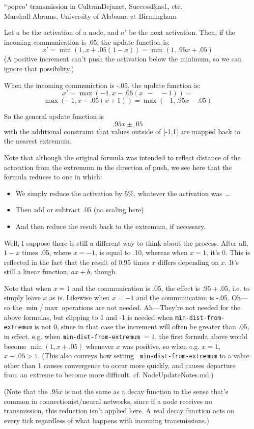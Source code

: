 \documentclass[11pt]{article}
\author{Marshall Abrams, University of Alabama at Birmingham, mabrams@uab.edu}
\makeatletter
\newcommand{\eg}{e.g.\@\xspace}
\newcommand{\cf}{cf.\@\xspace}
\makeatother
\begin{document}
\pagestyle{empty}
\myfontscale %

{\Large ``popco" transmission in CultranDejanet, SuccessBias1, etc.}\\
{\large Marshall Abrams, University of Alabama at Birmingham}


Let $a$ be the activation of a node, and $a'$ be the next activation.
Then, if the incoming communication is .05, the update function
is:
\[
x' = \min(1,x + .05(1 - x)) = \min(1,.95x + .05)
\]
(A positive increment can't push the activation below the
minimum, so we can ignore that possibility.)

When the incoming communiction is -.05, the update function is:
\[
x' = 
\max(-1,x - .05(x \;\,-\;\;\; -1)) = 
\]
%
\[
\max(-1,x - .05(x + 1)) =  \max(-1, .95x - .05)
\]
%

So the general update function is
\[
.95x \pm .05
\]
with the additional constraint that values outside of [-1,1] are
mapped back to the nearest extremum.

Note that although the original formula was intended to reflect
distance of the activation from the extremum in the direction of
push, we see here that the formula reduces to one in which:
\begin{itemize}\vspace{-2ex}
\item We simply reduce the activation by 5\%, whatever the
activation was\ \ldots
\item Then add or subtract .05 (no scaling here)
\item And then reduce the result back to the extremum, if necessary.
\end{itemize}
Well, I suppose there is still a different way to think about the
process.  After all, $1-x$ times .05, where $x = -1$, is
equal to .10, whereas when $x=1$, it's 0.  This is reflected
in the fact that the result of 0.95 times $x$ differs depending
on $x$.  It's still a linear function, $ax+b$, though.

Note that when $x=1$ and the communication is .05, the effect is
$.95 + .05$, i.e. to simply leave $x$ as is.  Likewise when
$x=-1$ and the communication is -.05.  Oh---so the $\min$/$\max$
operations are not needed.  Ah---They're not needed for the above
formulas, but clipping to 1 and -1 is needed when 
{\tt min-dist-from-extremum} is not 0, since in that case the
increment will often be greater than .05, in effect.  \eg when 
{\tt min-dist-from-extremum} $=1$, the first formula above would
become $\min(1,x+.05)$ whenever $x$ was positive, so when \eg
$x=1$, $x+.05>1$.  (This also conveys how setting {\tt
min-dist-from-extremum} to a value other than 1 causes
convergence to occur more quickly, and causes departure from an extreme
to become more difficult.  \cf NodeUpdateNotes.md.)

(Note that the $.95x$ is not the same as a decay function in the
sense that's common in connectionist/neural networks, since if a
node receives no transmission, this reduction isn't applied here.  A
real decay function acts on every tick regardless of what
happens with incoming transmissions.)

%
\end{document}
